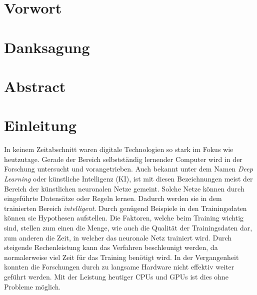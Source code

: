 \documentclass[a4paper,12pt,oneside]{article}
\begin{document}
  \newpage
  \section*{Vorwort}
  \section*{Danksagung}
  \section*{Abstract}
  \newpage
  \listoffigures
  \newpage
  \listoftables
  \newpage
  \tableofcontents
  \newpage
  \section{Einleitung}\label{s.einleitung} 
In keinem Zeitabschnitt waren digitale Technologien so stark im Fokus wie heutzutage. Gerade der Bereich selbstständig lernender Computer wird in der Forschung untersucht und vorangetrieben. Auch bekannt unter dem Namen \textit{Deep Learning} oder künstliche Intelligenz (KI), ist mit diesen Bezeichnungen meist der Bereich der künstlichen neuronalen Netze gemeint. Solche Netze können durch eingeführte Datensätze oder Regeln lernen. Dadurch werden sie in dem trainierten Bereich \textit{intelligent}. Durch genügend Beispiele in den Trainingsdaten können sie Hypothesen aufstellen. Die Faktoren, welche beim Training wichtig sind, stellen zum einen die Menge, wie auch die Qualität der Trainingsdaten dar, zum anderen die Zeit, in welcher das neuronale Netz trainiert wird. Durch steigende Rechenleistung kann das Verfahren beschleunigt werden, da normalerweise viel Zeit für das Training benötigt wird. In der Vergangenheit konnten die Forschungen durch zu langsame Hardware nicht effektiv weiter geführt werden. Mit der Leistung heutiger CPUs und GPUs ist dies ohne Probleme möglich.\\ 
\end{document}
